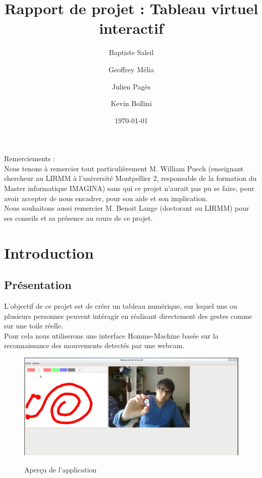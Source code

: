 \documentclass{report}
\title{Rapport de projet : Tableau virtuel interactif}
\author{Baptiste Saleil \and Geoffrey Mélia \and Julien Pagès \and Kevin Bollini}
\date{\today}
\begin{document}
	\maketitle
	\thispagestyle{empty}
	\newpage
	
	\tableofcontents

	\listoffigures
	
	\newpage 
	Remerciements : \\
	
	Nous tenons à remercier tout particulièrement M. William Puech (enseignant chercheur au LIRMM à l'université Montpellier 2, responsable de la formation du Master informatique IMAGINA) sans qui ce projet n'aurait pas pu se faire, pour avoir accepter de nous encadrer, pour son aide et son implication.\\
	Nous souhaitons aussi remercier M. Benoit Lange (doctorant au LIRMM) pour ses conseils et sa présence au cours de ce projet. \\
	\newpage
	\chapter{Introduction}
		\section{Présentation}
		L'objectif de ce projet est de créer un tableau numérique, sur lequel une ou plusieurs personnes peuvent intéragir en réalisant directement des gestes comme sur une toile réelle. \\
		Pour cela nous utiliserons une interface Homme-Machine basée sur la reconnaissance des mouvements detectés par une webcam.

		\begin{figure}[!h]
			\centering
			\includegraphics[scale=0.3]{../soutenance/capture-intro.png}\\
			\caption{Aperçu de l'application}
			\label{Aperçu de l'application}
		\end{figure}
	\newpage
\end{document}

